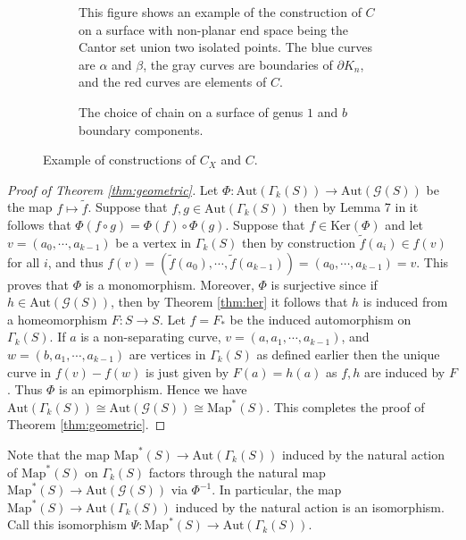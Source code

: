 \documentclass[11pt]{article}
\def\a{\alpha}
\def\b{\beta}
\def\map{\text{Map}}
\def\Aut{\text{Aut}}
\begin{document}
\begin{figure}[t]
\centering
\def\svgwidth{\textwidth}
\begin{subfigure}{0.5\textwidth}
  
  \caption{This figure shows an example of the construction of $C$ on a surface with non-planar end space being the Cantor set union two isolated points. The blue curves are $\a$ and $\b$, the gray curves are boundaries of $\partial K_n$, and the red curves are elements of $C$.}
  \label{fig:big_surface}
\end{subfigure}
\hfill
\def\svgwidth{0.7\textwidth}
\begin{subfigure}{0.3\textwidth}
  
  \caption{The choice of chain on a surface of genus $1$ and $b$ boundary components.}
  \label{fig:small_surface}
\end{subfigure}
\caption{Example of constructions of $C_X$ and $C$.}
\end{figure}
\begin{proof}[Proof of Theorem \ref{thm:geometric}]
 Let $\Phi: \Aut(\Gamma_k(S)) \to \Aut(\mathcal{G}(S))$ be the map $f \mapsto \tilde{f}$. Suppose that $f,g\in \Aut(\Gamma_k(S))$ then by Lemma 7 in \cite{irmak2004} it follows that $\Phi(f\circ g) = \Phi(f)\circ \Phi(g)$. Suppose that $f\in \text{Ker}(\Phi)$ and let $v = (a_0,\cdots, a_{k-1})$ be a vertex in $\Gamma_k(S)$ then by construction $\tilde{f}(a_i) \in f(v)$ for all $i$, and thus $f(v) = (\tilde{f}(a_0), \cdots, \tilde{f}(a_{k-1})) = (a_0, \cdots, a_{k-1}) = v$. This proves that $\Phi$ is a monomorphism. Moreover, $\Phi$ is surjective since if $h\in \Aut(\mathcal{G}(S))$, then by Theorem \ref{thm:her} it follows that $h$ is induced from a homeomorphism $F:S\to S$. Let $f = F_*$ be the induced automorphism on $\Gamma_k(S)$. If $a$ is a non-separating curve, $v = (a, a_1, \cdots, a_{k-1})$, and $w = (b, a_1, \cdots, a_{k-1})$ are vertices in $\Gamma_k(S)$ as defined earlier then the unique curve in $f(v) - f(w)$ is just given by $F(a) = h(a)$ as $f,h$ are induced by $F$. Thus $\Phi$ is an epimorphism. Hence we have $\Aut(\Gamma_k(S)) \cong \Aut( \mathcal{G}(S)) \cong \map^*(S)$. This completes the proof of Theorem \ref{thm:geometric}.  
\end{proof}

Note that the map $\map^*(S) \to \Aut(\Gamma_k(S))$ induced by the natural action of $\map^*(S)$ on $\Gamma_k(S)$ factors through the natural map $\map^*(S) \to \Aut( \mathcal{G}(S))$ via $\Phi^{-1}$. In particular, the map $\map^*(S)\to \Aut(\Gamma_k(S))$ induced by the natural action is an isomorphism. Call this isomorphism $\Psi: \map^*(S)\to \Aut(\Gamma_k(S))$.
\end{document}
